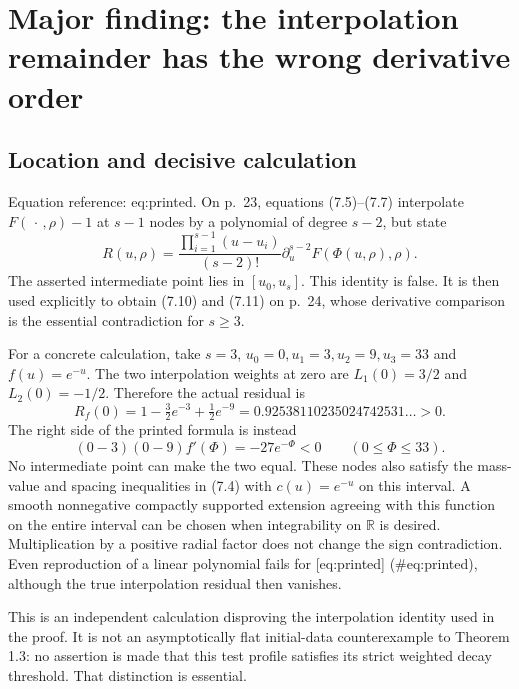 \documentclass[10pt]{article}
\begin{document}
\section*{Major finding: the interpolation remainder has the wrong derivative order}
\subsection*{Location and decisive calculation}
Equation reference: eq:printed. On p. 23, equations (7.5)–(7.7) interpolate \(F(\,\cdot\,,\rho)-1\) at \(s-1\) nodes by a polynomial of degree \(s-2\), but state \[
 R(u,\rho)=\frac{\prod_{i=1}^{s-1}(u-u_i)}{(s-2)!}
             \partial_u^{s-2}F(\Phi(u,\rho),\rho).\] The asserted intermediate point lies in \([u_0,u_s]\). This identity is false. It is then used explicitly to obtain (7.10) and (7.11) on p. 24, whose derivative comparison is the essential contradiction for \(s\geq3\).\par
For a concrete calculation, take \(s=3\), \(u_0=0,u_1=3,u_2=9,u_3=33\) and \(f(u)=e^{-u}\). The two interpolation weights at zero are \(L_1(0)=3/2\) and \(L_2(0)=-1/2\). Therefore the actual residual is \[R_f(0)=1-\tfrac32e^{-3}+\tfrac12e^{-9}
       =0.92538110235024742531\ldots>0.\] The right side of the printed formula is instead \[(0-3)(0-9)f'(\Phi)=-27e^{-\Phi}<0
 \qquad(0\leq\Phi\leq33).\] No intermediate point can make the two equal. These nodes also satisfy the mass-value and spacing inequalities in (7.4) with \(c(u)=e^{-u}\) on this interval. A smooth nonnegative compactly supported extension agreeing with this function on the entire interval can be chosen when integrability on \(\mathbb R\) is desired. Multiplication by a positive radial factor does not change the sign contradiction. Even reproduction of a linear polynomial fails for [eq:printed] (\#eq:printed), although the true interpolation residual then vanishes.\par
This is an independent calculation disproving the interpolation identity used in the proof. It is not an asymptotically flat initial-data counterexample to Theorem 1.3: no assertion is made that this test profile satisfies its strict weighted decay threshold. That distinction is essential.\par
\end{document}

